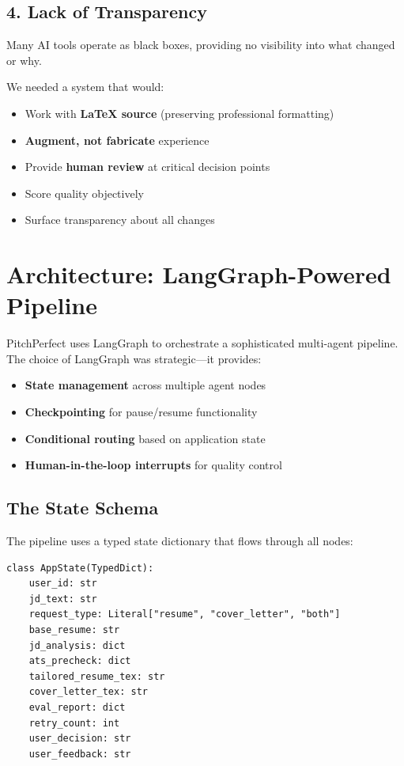 \documentclass[12pt, a4paper]{article}
\begin{document}
\subsection*{4. Lack of Transparency}
Many AI tools operate as black boxes, providing no visibility into what changed or why.

\bigskip

We needed a system that would:
\begin{itemize}
    \item Work with \textbf{LaTeX source} (preserving professional formatting)
    \item \textbf{Augment, not fabricate} experience
    \item Provide \textbf{human review} at critical decision points
    \item Score quality objectively
    \item Surface transparency about all changes
\end{itemize}

\newpage

\section{Architecture: LangGraph-Powered Pipeline}

PitchPerfect uses LangGraph to orchestrate a sophisticated multi-agent pipeline. The choice of LangGraph was strategic---it provides:

\begin{itemize}
    \item \textbf{State management} across multiple agent nodes
    \item \textbf{Checkpointing} for pause/resume functionality
    \item \textbf{Conditional routing} based on application state
    \item \textbf{Human-in-the-loop interrupts} for quality control
\end{itemize}

\subsection{The State Schema}

The pipeline uses a typed state dictionary that flows through all nodes:

\begin{verbatim}
class AppState(TypedDict):
    user_id: str
    jd_text: str
    request_type: Literal["resume", "cover_letter", "both"]
    base_resume: str
    jd_analysis: dict
    ats_precheck: dict
    tailored_resume_tex: str
    cover_letter_tex: str
    eval_report: dict
    retry_count: int
    user_decision: str
    user_feedback: str
\end{verbatim}
\end{document}
